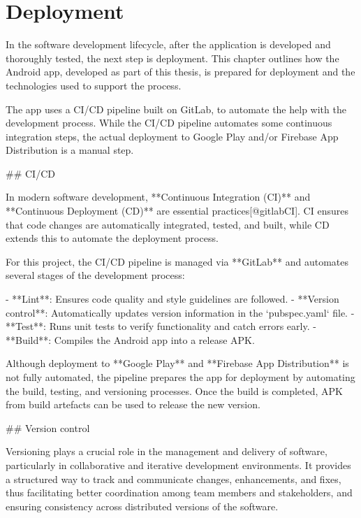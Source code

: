 \documentclass[
  digital,     %
  oneside,     %
  nosansbold,  %
  nocolorbold, %
  lof,         %
  lot,         %
]{fithesis4}
\begin{document}
\chapter{Deployment}
\label{chap:deployment}
\shorthandoff{-}
\begin{markdown}

In the software development lifecycle, after the application is developed and thoroughly tested, the next step is deployment. This chapter outlines how the Android app, developed as part of this thesis, is prepared for deployment and the technologies used to support the process.

The app uses a CI/CD pipeline built on GitLab, to automate the help with the development process.  While the CI/CD pipeline automates some continuous integration steps, the actual deployment to Google Play and/or Firebase App Distribution is a manual step.

## CI/CD

In modern software development, **Continuous Integration (CI)** and **Continuous Deployment (CD)** are essential practices[@gitlabCI]. CI ensures that code changes are automatically integrated, tested, and built, while CD extends this to automate the deployment process.

For this project, the CI/CD pipeline is managed via **GitLab** and automates several stages of the development process:

- **Lint**: Ensures code quality and style guidelines are followed.
- **Version control**: Automatically updates version information in the `pubspec.yaml` file.
- **Test**: Runs unit tests to verify functionality and catch errors early.
- **Build**: Compiles the Android app into a release APK.

Although deployment to **Google Play** and **Firebase App Distribution** is not fully automated, the pipeline prepares the app for deployment by automating the build, testing, and versioning processes. Once the build is completed, APK from build artefacts can be used to release the new version.

## Version control

Versioning plays a crucial role in the management and delivery of software, particularly in collaborative and iterative development environments. It provides a structured way to track and communicate changes, enhancements, and fixes, thus facilitating better coordination among team members and stakeholders, and ensuring consistency across distributed versions of the software.


\end{markdown}
\end{document}
